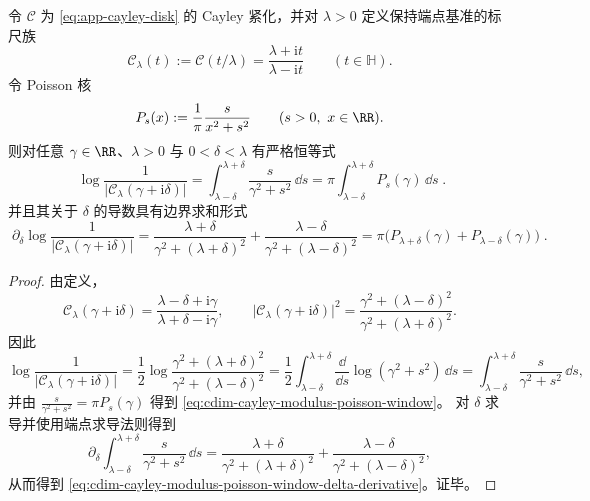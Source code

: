 \begin{proposition}\label{prop:cdim-cayley-poisson-window-identity}
令 \(\mathcal{C}\) 为 \eqref{eq:app-cayley-disk} 的 Cayley 紧化，并对 \(\lambda>0\) 定义保持端点基准的标尺族
\[
\mathcal{C}_{\lambda}(t):=\mathcal{C}(t/\lambda)=\frac{\lambda+\mathrm{i}t}{\lambda-\mathrm{i}t}
\qquad(t\in\mathbb{H}).
\]
令 Poisson 核
\[
P_{s}(x):=\frac{1}{\pi}\frac{s}{x^{2}+s^{2}}
\qquad(s>0,\ x\in\RR).
\]
则对任意 \(\gamma\in\RR\)、\(\lambda>0\) 与 \(0<\delta<\lambda\) 有严格恒等式
\begin{equation}\label{eq:cdim-cayley-modulus-poisson-window}
\boxed{\;
\log\frac{1}{\bigl|\mathcal{C}_{\lambda}(\gamma+\mathrm{i}\delta)\bigr|}
=\int_{\lambda-\delta}^{\lambda+\delta}\frac{s}{\gamma^{2}+s^{2}}\,\dd s
=\pi\int_{\lambda-\delta}^{\lambda+\delta}P_{s}(\gamma)\,\dd s\; }.
\end{equation}
并且其关于 \(\delta\) 的导数具有边界求和形式
\begin{equation}\label{eq:cdim-cayley-modulus-poisson-window-delta-derivative}
\boxed{\;
\partial_{\delta}\log\frac{1}{\bigl|\mathcal{C}_{\lambda}(\gamma+\mathrm{i}\delta)\bigr|}
=\frac{\lambda+\delta}{\gamma^{2}+(\lambda+\delta)^{2}}+\frac{\lambda-\delta}{\gamma^{2}+(\lambda-\delta)^{2}}
=\pi\bigl(P_{\lambda+\delta}(\gamma)+P_{\lambda-\delta}(\gamma)\bigr)\; }.
\end{equation}
\end{proposition}
\begin{proof}
由定义，
\[
\mathcal{C}_{\lambda}(\gamma+\mathrm{i}\delta)=\frac{\lambda-\delta+\mathrm{i}\gamma}{\lambda+\delta-\mathrm{i}\gamma},
\qquad
\bigl|\mathcal{C}_{\lambda}(\gamma+\mathrm{i}\delta)\bigr|^{2}
=\frac{\gamma^{2}+(\lambda-\delta)^{2}}{\gamma^{2}+(\lambda+\delta)^{2}}.
\]
因此
\[
\log\frac{1}{\bigl|\mathcal{C}_{\lambda}(\gamma+\mathrm{i}\delta)\bigr|}
=\frac12\log\frac{\gamma^{2}+(\lambda+\delta)^{2}}{\gamma^{2}+(\lambda-\delta)^{2}}
=\frac12\int_{\lambda-\delta}^{\lambda+\delta}\frac{\dd}{\dd s}\log(\gamma^{2}+s^{2})\,\dd s
=\int_{\lambda-\delta}^{\lambda+\delta}\frac{s}{\gamma^{2}+s^{2}}\,\dd s,
\]
并由 \(\frac{s}{\gamma^{2}+s^{2}}=\pi P_{s}(\gamma)\) 得到 \eqref{eq:cdim-cayley-modulus-poisson-window}。
对 \(\delta\) 求导并使用端点求导法则得到
\[
\partial_{\delta}\int_{\lambda-\delta}^{\lambda+\delta}\frac{s}{\gamma^{2}+s^{2}}\,\dd s
=\frac{\lambda+\delta}{\gamma^{2}+(\lambda+\delta)^{2}}+\frac{\lambda-\delta}{\gamma^{2}+(\lambda-\delta)^{2}},
\]
从而得到 \eqref{eq:cdim-cayley-modulus-poisson-window-delta-derivative}。证毕。
\end{proof}

